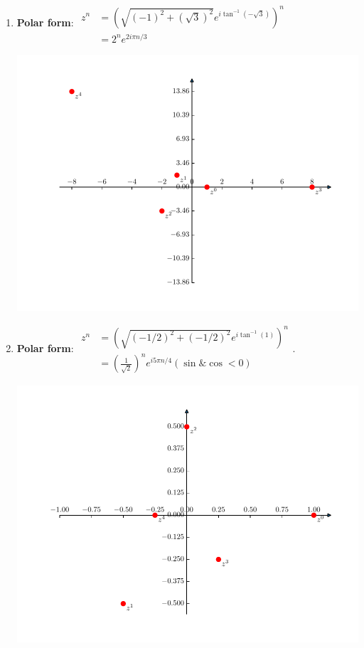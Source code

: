\documentclass[
    classnum=MATH564,
    classname=MATHEMATICAL\ MODELING,
    due=January\ 28\,\ 2020,
    author=Gabrielle\ Streeter\qquad Hannah\ Wu\qquad\ Minghang\ Li,
    authorshort=Streeter\ \&\ Wu\ \&\ Li,
    teacher= Zachary\ M.\ Boyd,
    hw=1
]{../hw-template}
\newenvironment{Figure}
    {\par\medskip\noindent\minipage{\linewidth}}
    {\endminipage\par\medskip}
\begin{document}
\begin{homeworkProblem}
\begin{multicols}{2}
\begin{enumerate}
\item \textbf{Polar form}:
$\begin{aligned}
    z^n &= (\sqrt{(-1)^2 + (\sqrt{3})^2} e^{i\tan^{-1}(-\sqrt{3})})^n\\
    &= 2^n e^{2i\pi n/3}
\end{aligned}$
\begin{Figure}
    \centering
    \includegraphics[scale=0.5]{media/hw1/fig8(d).pdf}
\end{Figure}
\item \textbf{Polar form}:
$\begin{aligned}
    z^n &= (\sqrt{(-1/2)^2+(-1/2)^2} e^{i\tan^{-1}(1)})^n\\
    &=(\frac{1}{\sqrt{2}})^n e^{i5\pi n/4} (\sin \& \cos < 0)
\end{aligned}$.
\begin{Figure}
    \centering
    \includegraphics[scale=0.5]{media/hw1/fig8(e).pdf}
\end{Figure}

\end{enumerate}
\end{multicols}
\end{homeworkProblem}
\end{document}
